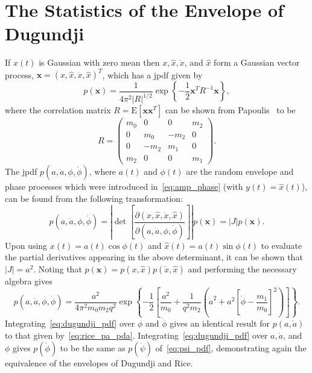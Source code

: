 \documentclass[12pt]{article}
\theoremstyle{plain}
\theoremstyle{definition}
\theoremstyle{remark}
\begin{document}
\section{The Statistics of the Envelope of Dugundji}
\label{sec:dugundji}
If $x(t)$ is Gaussian with zero mean then $x, \hat{x}, \dot{x}$, and $\hat{x}$ form a Gaussian vector process, $\mathbf{x} = (x, \hat{x}, \dot{x}, \hat{x})^T$, which has a jpdf given by
\begin{equation}
    p(\mathbf{x}) = \frac{1}{4\pi^2 |R|^{1/2}} \exp \left\{ -\frac{1}{2} \mathbf{x}^T R^{-1} \mathbf{x} \right\},
    \label{eq:dugundji_jpdf}
\end{equation}
where the correlation matrix $R = \mathrm{E}[\mathbf{x} \mathbf{x}^T]$ can be shown from Papoulis~\cite{papoulis1984} to be
\begin{equation}
    R = \begin{pmatrix}
        m_0 & 0 & 0 & m_2 \\
        0 & m_0 & -m_2 & 0 \\
        0 & -m_2 & m_1 & 0 \\
        m_2 & 0 & 0 & m_1
    \end{pmatrix}.
    \label{eq:dugundji_R}
\end{equation}
The jpdf $p(a, \dot{a}, \phi, \dot{\phi})$, where $a(t)$ and $\phi(t)$ are the random envelope and phase processes which were introduced in~\eqref{eq:amp_phase} (with $y(t) = \hat{x}(t)$), can be found from the following transformation:
\begin{equation}
    p(a, \dot{a}, \phi, \dot{\phi}) = \left| \det \left[ \frac{\partial (x, \hat{x}, \dot{x}, \hat{x})}{\partial (a, \dot{a}, \phi, \dot{\phi})} \right] \right| p(\mathbf{x}) = |J| p(\mathbf{x}).
    \label{eq:dugundji_jacobian}
\end{equation}
Upon using $x(t) = a(t) \cos \phi(t)$ and $\hat{x}(t) = a(t) \sin \phi(t)$ to evaluate the partial derivatives appearing in the above determinant, it can be shown that $|J| = a^2$. Noting that $p(\mathbf{x}) = p(x, \hat{x}) p(\dot{x}, \hat{x})$ and performing the necessary algebra gives
\begin{equation}
    p(a, \dot{a}, \phi, \dot{\phi}) = \frac{a^2}{4\pi^2 m_0 m_2 q^2} \exp \left\{ -\frac{1}{2} \left[ \frac{a^2}{m_0} + \frac{1}{q^2 m_2} \left( \dot{a}^2 + a^2 \left[ \dot{\phi} - \frac{m_1}{m_0} \right]^2 \right) \right] \right\}.
    \label{eq:dugundji_pdf}
\end{equation}
Integrating~\eqref{eq:dugundji_pdf} over $\phi$ and $\dot{\phi}$ gives an identical result for $p(a, \dot{a})$ to that given by~\eqref{eq:rice_pa_pda}. Integrating~\eqref{eq:dugundji_pdf} over $a, \dot{a}$, and $\phi$ gives $p(\dot{\phi})$ to be the same as $p(\dot{\psi})$ of~\eqref{eq:psi_pdf}, demonstrating again the equivalence of the envelopes of Dugundji and Rice.
\end{document}
